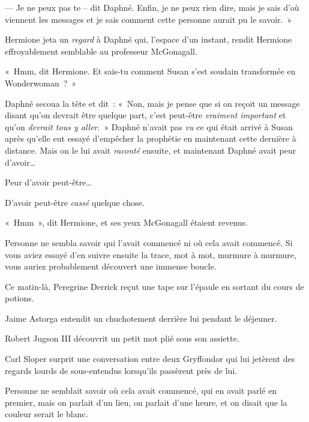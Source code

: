 --- Je ne peux pas te -- dit Daphné.
Enfin, je ne peux rien dire, mais je sais d'où viennent les messages et je sais comment cette personne aurait pu le savoir.~»

Hermione jeta un \emph{regard} à Daphné qui, l'espace d'un instant, rendit Hermione effroyablement semblable au professeur McGonagall.

«~Hmm, dit Hermione.
Et sais-tu comment Susan s'est soudain transformée en Wonderwoman~?~»

Daphné secoua la tête et dit~: «~Non, mais je pense que si on reçoit un message disant qu'on devrait être quelque part, c'est peut-être \emph{vraiment important} et qu'on \emph{devrait tous y aller}.~»
Daphné n'avait pas \emph{vu} ce qui était arrivé à Susan après qu'elle eut essayé d'empêcher la prophétie en maintenant cette dernière à distance.
Mais on le lui avait \emph{raconté} ensuite, et maintenant Daphné avait peur d'avoir…

Peur d'avoir peut-être…

D'avoir peut-être \emph{cassé} quelque chose.

«~Hmm~», dit Hermione, et ses yeux McGonagall étaient revenus.

\later

Personne ne sembla savoir qui l'avait commencé ni où cela avait commencé.
Si vous aviez essayé d'en suivre ensuite la trace, mot à mot, murmure à murmure, vous auriez probablement découvert une immense boucle.

Ce matin-là, Peregrine Derrick reçut une tape sur l'épaule en sortant du cours de potions.

Jaime Astorga entendit un chuchotement derrière lui pendant le déjeuner.

Robert Jugson III découvrit un petit mot plié sous son assiette.

Carl Sloper surprit une conversation entre deux Gryffondor qui lui jetèrent des regards lourds de sous-entendus lorsqu'ils passèrent près de lui.

Personne ne semblait savoir où cela avait commencé, qui en avait parlé en premier, mais on parlait d'un lieu, on parlait d'une heure, et on disait que la couleur serait le blanc.

\later

